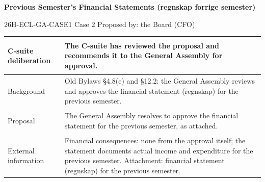 \documentclass{../../../Common/Latex/Templates/rapport}
\begin{document}
\reportmainmatter
\small
\setlength{\parindent}{0pt}
\setlength{\tabcolsep}{6pt}
\renewcommand{\arraystretch}{1.2}

\begin{center}
  {\Large\bfseries Previous Semester's Financial Statements (regnskap forrige semester)}\par
  \vspace{0.15cm}
  {\normalsize 26H-ECL-GA-CASE1 \textperiodcentered{} Case 2 \textperiodcentered{} Proposed by: the Board (CFO)}\par
  \vspace{0.1cm}
  {\small \meetingline}\par
\end{center}

\vspace{0.3cm}
\begin{tabularx}{\textwidth}{|>{\bfseries\raggedright\arraybackslash}p{4.2cm}|X|}
  \hline
  C-suite deliberation & The C-suite has reviewed the proposal and recommends it to the General Assembly for approval.                                                                                                                 \\
  \hline
  Background           & Old Bylaws \S4.8(e) and \S12.2: the General Assembly reviews and approves the financial statement (regnskap) for the previous semester.                                                                       \\
  \hline
  Proposal             & The General Assembly resolves to approve the financial statement for the previous semester, as attached.                                                                                                      \\
  \hline
  External information & Financial consequences: none from the approval itself; the statement documents actual income and expenditure for the previous semester. Attachment: financial statement (regnskap) for the previous semester. \\
  \hline
\end{tabularx}
\end{document}
